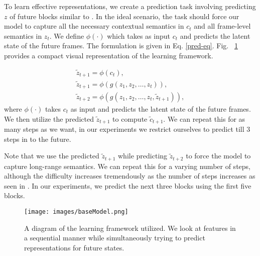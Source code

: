\documentclass[final]{cvpr}
\begin{document}
To learn effective representations, we create a prediction task involving predicting $z$ of future blocks similar to \cite{dpc}. In the ideal scenario, the task should force our model to capture all the necessary contextual semantics in $c_t$ and all frame-level semantics in $z_t$. We define $\phi(\cdot)$ which takes as input $c_t$ and predicts the latent state of the future frames. The formulation is given in Eq. \eqref{pred-eq}. Fig. ~\ref{learningFramework} provides a compact visual representation of the learning framework.

\begin{equation}
    \begin{split}
        \widetilde{z}_{t+1} = \phi(c_t),\\
        \widetilde{z}_{t+1} = \phi(g(z_1, z_2, \ldots, z_t)),\\
        \widetilde{z}_{t+2} = \phi(g(z_1, z_2, \ldots, z_t, \widetilde{z}_{t+1})),
    \end{split}
    \label{pred-eq}
\end{equation}
where $\phi(\cdot)$ takes $c_t$ as input and predicts the latent state of the future frames. We then utilize the predicted $\widetilde{z}_{t + 1}$ to compute $\widetilde{c}_{t+1}$. We can repeat this for as many steps as we want, in our experiments we restrict ourselves to predict till 3 steps in to the future.
 
Note that we use the predicted $\widetilde{z}_{t+1}$ while predicting $\widetilde{z}_{t+2}$ to force the model to capture long-range semantics. We can repeat this for a varying number of steps, although the difficulty increases tremendously as the number of steps increases as seen in \cite{dpc}. In our experiments, we predict the next three blocks using the first five blocks.

\begin{figure}[t]
      \centering
        \texttt{[image: images/baseModel.png]}
        \caption{A diagram of the learning framework utilized. We look at features in a sequential manner while simultaneously trying to predict representations for future states.}
        \label{learningFramework}
\end{figure}
\end{document}
